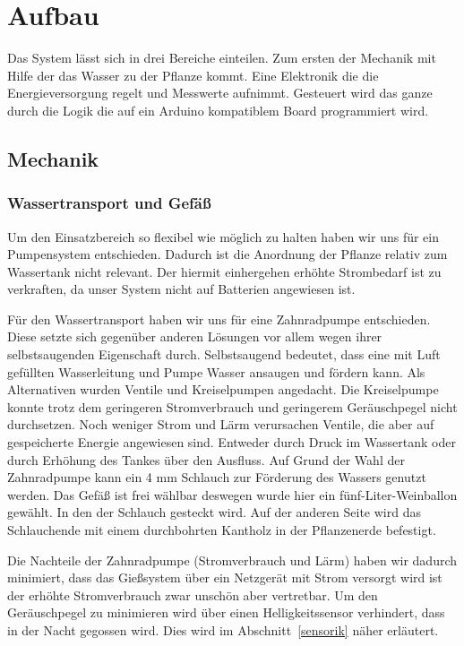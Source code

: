 \documentclass[]{IEEEtran}
\begin{document}
\section{Aufbau}
Das System lässt sich in drei Bereiche einteilen. Zum ersten der Mechanik mit Hilfe der das Wasser zu der Pflanze kommt. Eine Elektronik die die Energieversorgung regelt und Messwerte aufnimmt. Gesteuert wird das ganze durch die Logik die auf ein Arduino kompatiblem Board programmiert wird.
\subsection{Mechanik}
	\subsubsection{Wassertransport und Gefäß}
	Um den Einsatzbereich so flexibel wie möglich zu halten haben wir uns für ein Pumpensystem entschieden. Dadurch ist die Anordnung der Pflanze relativ zum Wassertank nicht relevant. Der hiermit einhergehen erhöhte Strombedarf ist zu verkraften, da unser System nicht auf Batterien angewiesen ist.
	
	Für den Wassertransport haben wir uns für eine Zahnradpumpe entschieden. Diese setzte sich gegenüber anderen Lösungen vor allem wegen ihrer selbstsaugenden Eigenschaft durch.
	 Selbstsaugend bedeutet, dass eine mit Luft gefüllten Wasserleitung und Pumpe Wasser ansaugen und fördern kann. Als Alternativen wurden Ventile und Kreiselpumpen angedacht. 
	 Die Kreiselpumpe konnte trotz dem geringeren Stromverbrauch und geringerem Geräuschpegel nicht durchsetzen. 
	 Noch weniger Strom und Lärm verursachen Ventile, die aber auf gespeicherte Energie angewiesen sind. 
	 Entweder durch Druck im Wassertank oder durch Erhöhung des Tankes über den Ausfluss. 
	 Auf Grund der Wahl der Zahnradpumpe kann ein 4 mm Schlauch zur Förderung des Wassers genutzt werden. Das Gefäß ist frei wählbar deswegen wurde hier ein fünf-Liter-Weinballon gewählt. 
	 In den der Schlauch gesteckt wird. Auf der anderen Seite wird das Schlauchende mit einem durchbohrten Kantholz in der Pflanzenerde befestigt.
	
	Die Nachteile der Zahnradpumpe (Stromverbrauch und Lärm) haben wir dadurch minimiert, dass das Gießsystem über ein Netzgerät mit Strom versorgt wird ist der erhöhte Stromverbrauch zwar unschön aber vertretbar. Um den Geräuschpegel zu minimieren wird über einen Helligkeitssensor verhindert, dass in der Nacht gegossen wird. Dies wird im Abschnitt~\ref{sensorik} näher erläutert.
	
\end{document}
